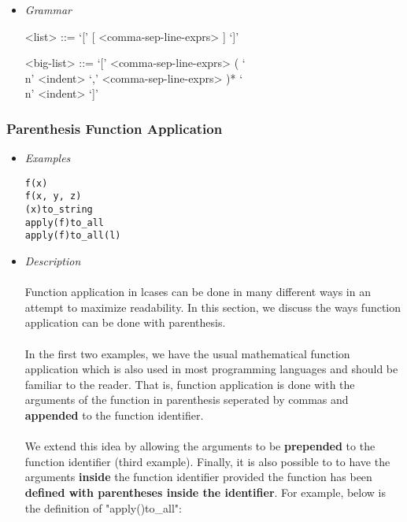 \documentclass{article}
\begin{document}
\begin{itemize}
\item \textit{Grammar}
\begin{grammar}
<list> ::= `[' [ <comma-sep-line-exprs> ] `]'

<big-list> ::= 
`[' <comma-sep-line-exprs>
( `\\n' <indent> `,' <comma-sep-line-exprs> )*
`\\n' <indent> `]'
\end{grammar}

\end{itemize}

\subsubsection{Parenthesis Function Application}
\label{subsec:parenfuncapp}

\begin{itemize}
\item \textit{Examples}

\begin{verbatim}
f(x)
f(x, y, z)
(x)to_string
apply(f)to_all
apply(f)to_all(l)
\end{verbatim}

\item \textit{Description}
\\\\
Function application in lcases can be done in many different ways in an attempt to 
maximize readability. In this section, we discuss the ways function application can
be done with parenthesis.
\\\\
In the first two examples, we have the usual mathematical
function application which is also used in most programming languages and
should be familiar to the reader. That is, function application is done with the 
arguments of the function in parenthesis seperated by commas and \textbf{appended}
to the function identifier.
\\\\
We extend this idea by allowing the arguments to be \textbf{prepended} to the
function identifier (third example). Finally, it is also possible to to have
the arguments \textbf{inside} the function identifier provided the function has
been \textbf{defined with parentheses inside the identifier}. For example,
below is the definition of "apply()to\_all":


\end{itemize}
\end{document}
